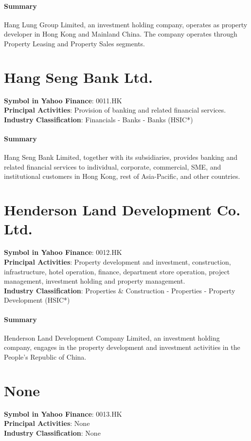 \paragraph{Summary}
Hang Lung Group Limited, an investment holding company, operates as property developer in Hong Kong and Mainland China. The company operates through Property Leasing and Property Sales segments.


\section{Hang Seng Bank Ltd.}
\textbf{Symbol in Yahoo Finance}: 0011.HK\\
\textbf{Principal Activities}: Provision of banking and related financial services.\\
\textbf{Industry Classification}: Financials - Banks - Banks (HSIC*)
\paragraph{Summary}
Hang Seng Bank Limited, together with its subsidiaries, provides banking and related financial services to individual, corporate, commercial, SME, and institutional customers in Hong Kong, rest of Asia-Pacific, and other countries.


\section{Henderson Land Development Co. Ltd.}
\textbf{Symbol in Yahoo Finance}: 0012.HK\\
\textbf{Principal Activities}: Property development and investment, construction, infrastructure, hotel operation, finance, department store operation, project management, investment holding and property management.\\
\textbf{Industry Classification}: Properties \& Construction - Properties - Property Development (HSIC*)
\paragraph{Summary}
Henderson Land Development Company Limited, an investment holding company, engages in the property development and investment activities in the People's Republic of China.


\section{None}
\textbf{Symbol in Yahoo Finance}: 0013.HK\\
\textbf{Principal Activities}: None\\
\textbf{Industry Classification}: None
